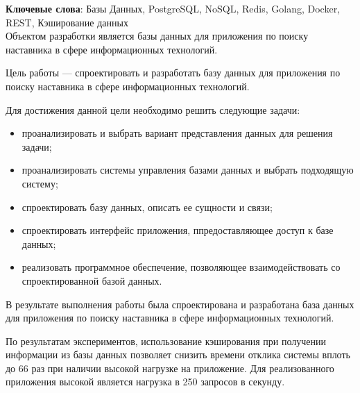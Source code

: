 \begin{essay}{}
    \noindent\textbf{Ключевые слова}: Базы Данных, PostgreSQL, NoSQL, Redis, Golang, Docker, REST, Кэширование данных\\
        
    Объектом разработки является базы данных для приложения по поиску наставника в сфере информационных технологий.
    
    Цель работы --- спроектировать и разработать базу данных для приложения по поиску наставника в сфере информационных технологий.
    
    Для достижения данной цели необходимо решить следующие задачи:
    
    \begin{itemize}
        \item проанализировать и выбрать вариант представления данных для решения задачи;
        \item проанализировать системы управления базами данных и выбрать подходящую систему;
        \item спроектировать базу данных, описать ее сущности и связи;
        \item спроектировать интерфейс приложения, ппредоставляющее доступ к базе данных;
        \item реализовать программное обеспечение, позволяющее взаимодействовать со спроектированной базой данных.
    \end{itemize}
    
    В результате выполнения работы была спроектирована и разработана база данных для приложения по поиску наставника в сфере информационных технологий.
    
    По результатам экспериментов, использование кэширования при получении информации из базы данных позволяет снизить времени отклика системы вплоть до 66 раз при наличии высокой нагрузке на приложение. Для реализованного приложения высокой является нагрузка в 250 запросов в секунду.  
\end{essay}